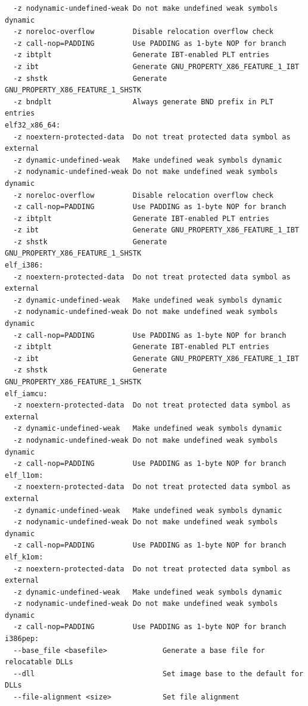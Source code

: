\documentclass{article}
\begin{document}
\begin{lstlisting}
  -z nodynamic-undefined-weak Do not make undefined weak symbols dynamic
  -z noreloc-overflow         Disable relocation overflow check
  -z call-nop=PADDING         Use PADDING as 1-byte NOP for branch
  -z ibtplt                   Generate IBT-enabled PLT entries
  -z ibt                      Generate GNU_PROPERTY_X86_FEATURE_1_IBT
  -z shstk                    Generate GNU_PROPERTY_X86_FEATURE_1_SHSTK
  -z bndplt                   Always generate BND prefix in PLT entries
elf32_x86_64:
  -z noextern-protected-data  Do not treat protected data symbol as external
  -z dynamic-undefined-weak   Make undefined weak symbols dynamic
  -z nodynamic-undefined-weak Do not make undefined weak symbols dynamic
  -z noreloc-overflow         Disable relocation overflow check
  -z call-nop=PADDING         Use PADDING as 1-byte NOP for branch
  -z ibtplt                   Generate IBT-enabled PLT entries
  -z ibt                      Generate GNU_PROPERTY_X86_FEATURE_1_IBT
  -z shstk                    Generate GNU_PROPERTY_X86_FEATURE_1_SHSTK
elf_i386:
  -z noextern-protected-data  Do not treat protected data symbol as external
  -z dynamic-undefined-weak   Make undefined weak symbols dynamic
  -z nodynamic-undefined-weak Do not make undefined weak symbols dynamic
  -z call-nop=PADDING         Use PADDING as 1-byte NOP for branch
  -z ibtplt                   Generate IBT-enabled PLT entries
  -z ibt                      Generate GNU_PROPERTY_X86_FEATURE_1_IBT
  -z shstk                    Generate GNU_PROPERTY_X86_FEATURE_1_SHSTK
elf_iamcu:
  -z noextern-protected-data  Do not treat protected data symbol as external
  -z dynamic-undefined-weak   Make undefined weak symbols dynamic
  -z nodynamic-undefined-weak Do not make undefined weak symbols dynamic
  -z call-nop=PADDING         Use PADDING as 1-byte NOP for branch
elf_l1om:
  -z noextern-protected-data  Do not treat protected data symbol as external
  -z dynamic-undefined-weak   Make undefined weak symbols dynamic
  -z nodynamic-undefined-weak Do not make undefined weak symbols dynamic
  -z call-nop=PADDING         Use PADDING as 1-byte NOP for branch
elf_k1om:
  -z noextern-protected-data  Do not treat protected data symbol as external
  -z dynamic-undefined-weak   Make undefined weak symbols dynamic
  -z nodynamic-undefined-weak Do not make undefined weak symbols dynamic
  -z call-nop=PADDING         Use PADDING as 1-byte NOP for branch
i386pep:
  --base_file <basefile>             Generate a base file for relocatable DLLs
  --dll                              Set image base to the default for DLLs
  --file-alignment <size>            Set file alignment

\end{lstlisting}
\end{document}
